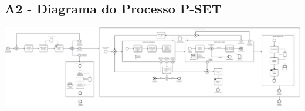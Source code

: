 \documentclass{article}
\begin{document}
\begin{landscape}
	\section*{A2 - Diagrama do Processo P-SET}
	\vspace*{\fill}
	\begin{center}
		\includegraphics[width=1.5\textheight,height=\textwidth,keepaspectratio]{A2-1}
	\end{center}
	\vspace*{\fill}
\end{landscape}

\pagebreak
\end{document}
